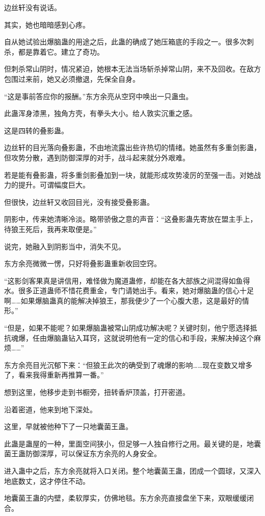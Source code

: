\begin{this_body}
边丝轩没有说话。

其实，她也暗暗感到心疼。

自从她试验出爆脑蛊的用途之后，此蛊的确成了她压箱底的手段之一。很多次刺杀，都是靠着它。建立了奇功。

但刺杀常山阴时，情况紧迫，她根本无法当场斩杀掉常山阴，来不及回收。在敌方包围过来前，她又必须撤退，先保全自身。

“这是事前答应你的报酬。”东方余亮从空窍中唤出一只蛊虫。

此蛊浑身漆黑，独角方壳，有拳头大小。给人敦实沉重之感。

这是四转的叠影蛊。

边丝轩的目光落向叠影蛊，不由地流露出些许热切的情绪。她虽然有多重剑影蛊，但攻势分散，遇到防御深厚的对手，战斗起来就分外艰难。

若是能有叠影蛊，将多重剑影叠加到一块，就能形成攻势凌厉的至强一击。对她战力的提升。可谓幅度巨大。

但很快，边丝轩又收回目光，没有接受叠影蛊。

阴影中，传来她清晰冷淡。略带骄傲之意的声音：“这叠影蛊先寄放在盟主手上，待狼王死后，我再来取便是。”

说完，她融入到阴影当中，消失不见。

东方余亮微微一愣，只好将叠影蛊重新收回空窍。

“这影剑客果真是讲信用，难怪做为魔道蛊修，却能在各大部族之间混得如鱼得水。很多正道蛊师不惜花费重金，专门请她出手。看来，她对爆脑蛊的信心十足啊……如果爆脑蛊真的能解决掉狼王，那我便少了一个心腹大患，这是最好的情形。”

“但是，如果不能呢？如果爆脑蛊被常山阴成功解决呢？关键时刻，他宁愿选择抵抗魂爆，任由爆脑蛊钻入耳窍，这就说明他有一定的信心和手段，来解决掉这个麻烦……”

东方余亮目光沉郁下来：“但狼王此次的确受到了魂爆的影响……现在变数又增多了，看来我得重新再推算一番。”

想到这里，他移步走到书橱旁，扭转香炉顶盖，打开密道。

沿着密道，他来到地下深处。

这里，早就被他种下了一只地囊菌王蛊。

此蛊是蛊屋的一种，里面空间狭小，但足够一人独自修行之用。最关键的是，地囊菌王蛊防御深厚，可以保证东方余亮的人身安全。

进入蛊中之后，东方余亮就将入口关闭。整个地囊菌王蛊，团成一个圆球，又深入地底数丈，这才停住不动。

地囊菌王蛊的内壁，柔软厚实，仿佛地毯。东方余亮直接盘坐下来，双眼缓缓闭合。


\end{this_body}
